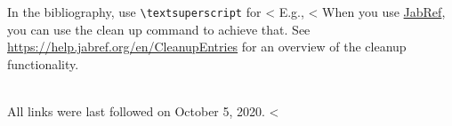 \documentclass[runningheads,a4paper,english]{llncs}[2018/03/10]
\begin{document}
In the bibliography, use \texttt{\textbackslash textsuperscript} for <%
E.g., <%
When you use \href{https://www.jabref.org}{JabRef}, you can use the clean up command to achieve that.
See \url{https://help.jabref.org/en/CleanupEntries} for an overview of the cleanup functionality.

\renewcommand{\bibsection}{\section*{References}} %

\begingroup
  \small %
  
\endgroup

\ \\
%
All links were last followed on October 5, 2020.
<%
\end{document}
